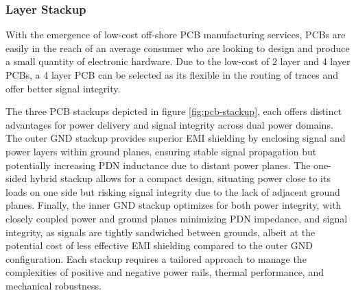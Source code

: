\documentclass[10pt]{article}
\begin{document}
\begin{multicols*}{2}
                \subsubsection{Layer Stackup}
                    With the emergence of low-cost off-shore PCB manufacturing services, PCBs are easily in the reach of an average consumer who are looking to design and produce a small quantity of electronic hardware. Due to the low-cost of 2 layer and 4 layer PCBs, a 4 layer PCB can be selected as its flexible in the routing of traces and offer better signal integrity.\par
                    The three PCB stackups depicted in figure \ref{fig:pcb-stackup}, each offers distinct advantages for power delivery and signal integrity across dual power domains. The outer GND stackup provides superior EMI shielding by enclosing signal and power layers within ground planes, ensuring stable signal propagation but potentially increasing PDN inductance due to distant power planes. The one-sided hybrid stackup allows for a compact design, situating power close to its loads on one side but risking signal integrity due to the lack of adjacent ground planes. Finally, the inner GND stackup optimizes for both power integrity, with closely coupled power and ground planes minimizing PDN impedance, and signal integrity, as signals are tightly sandwiched between grounds, albeit at the potential cost of less effective EMI shielding compared to the outer GND configuration. Each stackup requires a tailored approach to manage the complexities of positive and negative power rails, thermal performance, and mechanical robustness.

                    \begin{figure*}[ht]

                        \centering

                        \begin{subfigure}[b]{0.3333\linewidth}
                            \centering
\end{subfigure}
\end{figure*}
\end{multicols*}
\end{document}
